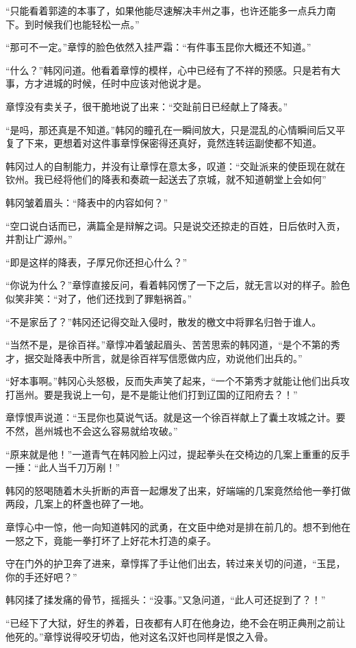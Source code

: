 “只能看着郭逵的本事了，如果他能尽速解决丰州之事，也许还能多一点兵力南下。到时候我们也能轻松一点。”

“那可不一定。”章惇的脸色依然入挂严霜：“有件事玉昆你大概还不知道。”

“什么？”韩冈问道。他看着章惇的模样，心中已经有了不祥的预感。只是若有大事，方才进城的时候，任时中应该对他说才是。

章惇没有卖关子，很干脆地说了出来：“交趾前日已经献上了降表。”

“是吗，那还真是不知道。”韩冈的瞳孔在一瞬间放大，只是混乱的心情瞬间后又平复了下来，更想着对这件事章惇保密得还真好，竟然连转运副使都不知道。

韩冈过人的自制能力，并没有让章惇在意太多，叹道：“交趾派来的使臣现在就在钦州。我已经将他们的降表和奏疏一起送去了京城，就不知道朝堂上会如何”

韩冈皱着眉头：“降表中的内容如何？”

“空口说白话而已，满篇全是辩解之词。只是说交还掠走的百姓，日后依时入贡，并割让广源州。”

“即是这样的降表，子厚兄你还担心什么？”

“你说为什么？”章惇直接反问，看着韩冈愣了一下之后，就无言以对的样子。脸色似笑非笑：“对了，他们还找到了罪魁祸首。”

“不是家岳了？”韩冈还记得交趾入侵时，散发的檄文中将罪名归咎于谁人。

“当然不是，是徐百祥。”章惇冲着皱起眉头、苦苦思索的韩冈道，“是个不第的秀才，据交趾降表中所言，就是徐百祥写信愿做内应，劝说他们出兵的。”

“好本事啊。”韩冈心头怒极，反而失声笑了起来，“一个不第秀才就能让他们出兵攻打邕州。要是我说上一句，是不是能让他们打到辽国的辽阳府去？！”

章惇恨声说道：“玉昆你也莫说气话。就是这一个徐百祥献上了囊土攻城之计。要不然，邕州城也不会这么容易就给攻破。”

“原来就是他！”一道青气在韩冈脸上闪过，提起拳头在交椅边的几案上重重的反手一捶：“此人当千刀万剐！”

韩冈的怒喝随着木头折断的声音一起爆发了出来，好端端的几案竟然给他一拳打做两段，几案上的杯盏也碎了一地。

章惇心中一惊，他一向知道韩冈的武勇，在文臣中绝对是排在前几的。想不到他在一怒之下，竟能一拳打坏了上好花木打造的桌子。

守在门外的护卫奔了进来，章惇挥了手让他们出去，转过来关切的问道，“玉昆，你的手还好吧？”

韩冈揉了揉发痛的骨节，摇摇头：“没事。”又急问道，“此人可还捉到了？！”

“已经下了大狱，好生的养着，日夜都有人盯在他身边，绝不会在明正典刑之前让他死的。”章惇说得咬牙切齿，他对这名汉奸也同样是恨之入骨。

